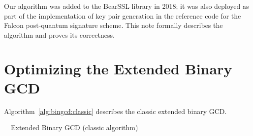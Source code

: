 \documentclass{llncs}
\begin{document}
Our algorithm was added to the BearSSL library\cite{BearSSL} in 2018; it
was also deployed as part of the implementation of key pair generation
in the reference code for the Falcon post-quantum signature
scheme\cite{Falcon}. This note formally describes the algorithm and
proves its correctness.

\section{Optimizing the Extended Binary GCD}

Algorithm~\ref{alg:bingcd:classic} describes the classic extended
binary GCD.

\begin{algorithm}[H]
    \caption{\ \ Extended Binary GCD (classic algorithm)\label{alg:bingcd:classic}}
    \begin{algorithmic}[1]
            \Else
                \EndIf
            \EndIf
        \EndWhile
        \EndIf
    \end{algorithmic}
\end{algorithm}
\end{document}
